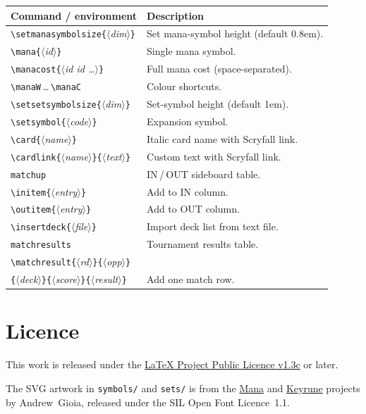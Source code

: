 \documentclass[a4paper,11pt]{article}
\newcommand{\env}[1]{\texttt{#1}}
\newcommand{\file}[1]{\texttt{#1}}
\newcommand{\cmd}[1]{\texttt{\textbackslash#1}}
\newcommand{\meta}[1]{\textnormal{\textit{$\langle$#1$\rangle$}}}
\newcommand{\carg}[1]{\texttt{\{}\meta{#1}\texttt{\}}}
\begin{document}
\begin{longtable}{@{} p{5.8cm} p{7.5cm} @{}}
  \toprule
  \textbf{Command / environment}
    & \textbf{Description} \\
  \midrule\endhead
  \bottomrule\endfoot
  \cmd{setmanasymbolsize}\carg{dim}
    & Set mana-symbol height (default 0.8em). \\
  \cmd{mana}\carg{id}
    & Single mana symbol. \\
  \cmd{manacost}\carg{id id \ldots}
    & Full mana cost (space-separated). \\
  \cmd{manaW}\,\ldots\,\cmd{manaC}
    & Colour shortcuts. \\[3pt]
  \cmd{setsetsymbolsize}\carg{dim}
    & Set-symbol height (default 1em). \\
  \cmd{setsymbol}\carg{code}
    & Expansion symbol. \\[3pt]
  \cmd{card}\carg{name}
    & Italic card name with Scryfall link. \\
  \cmd{cardlink}\carg{name}\carg{text}
    & Custom text with Scryfall link. \\[3pt]
  \env{matchup}
    & IN\,/\,OUT sideboard table. \\
  \quad\cmd{initem}\carg{entry}
    & Add to IN column. \\
  \quad\cmd{outitem}\carg{entry}
    & Add to OUT column. \\[3pt]
  \cmd{insertdeck}\carg{file}
    & Import deck list from text file. \\[3pt]
  \env{matchresults}
    & Tournament results table. \\
  \cmd{matchresult}\carg{rd}\carg{opp}\\%
  \carg{deck}\carg{score}\carg{result}
    & Add one match row. \\
\end{longtable}

\section{Licence}

This work is released under the
\href{https://www.latex-project.org/lppl/lppl-1-3c/}%
{LaTeX Project Public Licence v1.3c} or later.

The SVG artwork in \file{symbols/} and \file{sets/} is from
the \href{https://mana.andrewgioia.com}{Mana} and
\href{https://keyrune.andrewgioia.com}{Keyrune} projects by
Andrew~Gioia, released under the SIL Open Font Licence~1.1.
\end{document}

